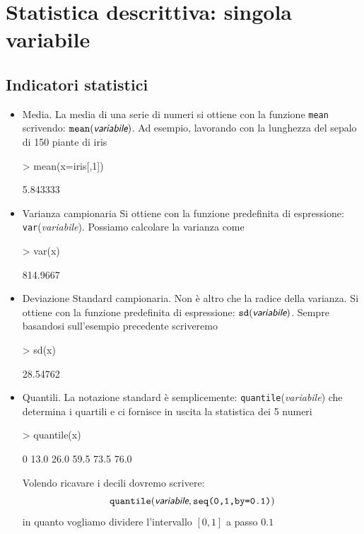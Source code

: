 \documentclass[onecolumn,11pt]{book}
\newcommand{\varia}[1]{\textsl{\textsf{#1}}}
\begin{document}
 
\section{Statistica descrittiva: singola variabile}
\subsection{Indicatori statistici}
\begin{itemize}
\item{}Media.\vskip0pt
La media di una serie di numeri si ottiene con la funzione \texttt{mean} scrivendo:
$\texttt{mean}(\varia{variabile})$.
Ad esempio, lavorando con la lunghezza del sepalo di 150 piante di iris
\begin{Schunk}
\begin{Sinput}
> mean(x=iris[,1])
\end{Sinput}
\begin{Soutput}
[1] 5.843333
\end{Soutput}
\end{Schunk}
\item{}Varianza campionaria\vskip0pt
Si ottiene con la funzione predefinita di espressione:
\texttt{var}(\varia{variabile}).
Possiamo calcolare la varianza come
\begin{Schunk}
\begin{Sinput}
> var(x)
\end{Sinput}
\begin{Soutput}
[1] 814.9667
\end{Soutput}
\end{Schunk}
\item{}Deviazione Standard campionaria.\vskip0pt
Non \`e altro che la radice della varianza. Si ottiene con la funzione predefinita di espressione:
$\texttt{sd}(\varia{variabile})$.
Sempre basandosi sull'esempio precedente scriveremo
\begin{Schunk}
\begin{Sinput}
> sd(x)
\end{Sinput}
\begin{Soutput}
[1] 28.54762
\end{Soutput}
\end{Schunk}

\item{}Quantili. La notazione standard \`e semplicemente: \texttt{quantile}(\varia{variabile}) che determina i quartili e ci fornisce in uscita la statistica dei 5 numeri
 
\begin{Schunk}
\begin{Sinput}
> quantile(x)
\end{Sinput}
\begin{Soutput}
  0%
13.0 26.0 59.5 73.5 76.0 
\end{Soutput}
\end{Schunk}
 Volendo ricavare i decili dovremo scrivere:
$$\texttt{quantile}(\varia{variabile},\texttt{seq(0,1,by=0.1)})$$
in quanto vogliamo dividere l'intervallo $[0,1]$ a passo $0.1$


\end{itemize}
\end{document}
